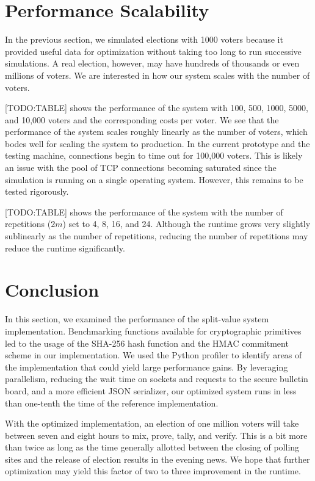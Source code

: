 \section{Performance Scalability}

In the previous section, we simulated elections with 1000 voters because it provided useful data for optimization without taking too long to run successive simulations. A real election, however, may have hundreds of thousands or even millions of voters. We are interested in how our system scales with the number of voters.

[TODO:TABLE] shows the performance of the system with 100, 500, 1000, 5000, and 10,000 voters and the corresponding costs per voter. We see that the performance of the system scales roughly linearly as the number of voters, which bodes well for scaling the system to production. In the current prototype and the testing machine, connections begin to time out for 100,000 voters. This is likely an issue with the pool of TCP connections becoming saturated since the simulation is running on a single operating system. However, this remains to be tested rigorously.

[TODO:TABLE] shows the performance of the system with the number of repetitions ($2m$) set to 4, 8, 16, and 24. Although the runtime grows very slightly sublinearly as the number of repetitions, reducing the number of repetitions may reduce the runtime significantly.

\section{Conclusion}

In this section, we examined the performance of the split-value system implementation. Benchmarking functions available for cryptographic primitives led to the usage of the SHA-256 hash function and the HMAC commitment scheme in our implementation. We used the Python profiler to identify areas of the implementation that could yield large performance gains. By leveraging parallelism, reducing the wait time on sockets and requests to the secure bulletin board, and a more efficient JSON serializer, our optimized system runs in less than one-tenth the time of the reference implementation.

With the optimized implementation, an election of one million voters will take between seven and eight hours to mix, prove, tally, and verify. This is a bit more than twice as long as the time generally allotted between the closing of polling sites and the release of election results in the evening news. We hope that further optimization may yield this factor of two to three improvement in the runtime.


